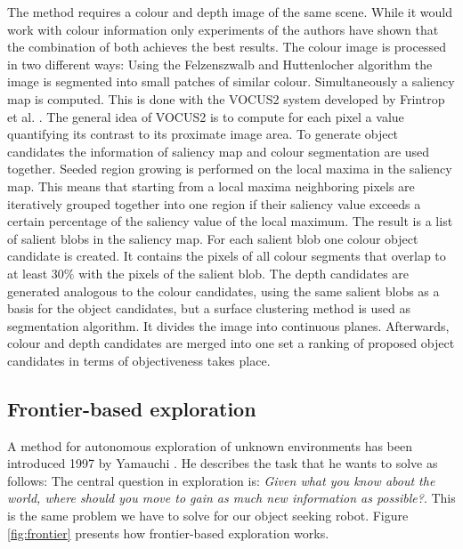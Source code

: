 \documentclass[a4paper,11pt,english]{article}
\begin{document}
The method requires a colour and depth image of the same scene.
While it would work with colour information only experiments of the authors have shown that the combination of both achieves the best results.
The colour image is processed in two different ways: 
Using the Felzenszwalb and Huttenlocher algorithm \cite{felzenszwalb2004efficient} the image is segmented into small patches of similar colour.
Simultaneously a saliency map is computed. This is done with the VOCUS2 system developed by Frintrop et al. \cite{frintrop2015traditional}.
The general idea of VOCUS2 is to compute for each pixel a value quantifying its contrast to its proximate image area.
To generate object candidates the information of saliency map and colour segmentation are used together.
Seeded region growing is performed on the local maxima in the saliency map.
This means that starting from a local maxima neighboring pixels are iteratively grouped together into one region if their saliency value exceeds a certain percentage of the saliency value of the local maximum.
The result is a list of salient blobs in the saliency map.
For each salient blob one colour object candidate is created. It contains the pixels of all colour segments that overlap to at least $30\%$ with the pixels of the salient blob.
The depth candidates are generated analogous to the colour candidates, using the same salient blobs as a basis for the object candidates, but a surface clustering method is used as segmentation algorithm. It divides the image into continuous planes.
Afterwards, colour and depth candidates are merged into one set a ranking of proposed object candidates in terms of \glqq{}objectiveness\grqq{} takes place.

\subsection{Frontier-based exploration}
A method for autonomous exploration of unknown  environments has been introduced 1997 by Yamauchi \cite{yamauchi1997frontier}.
He describes the task that he wants to solve as follows: \glqq{}The central question in exploration is: \textit{Given what you know about the world, where should you move to gain as much  new  information  as  possible?}\grqq{}.
This is the same problem we have to solve for our object seeking robot.
Figure \ref{fig:frontier} presents how frontier-based exploration works.
\end{document}

